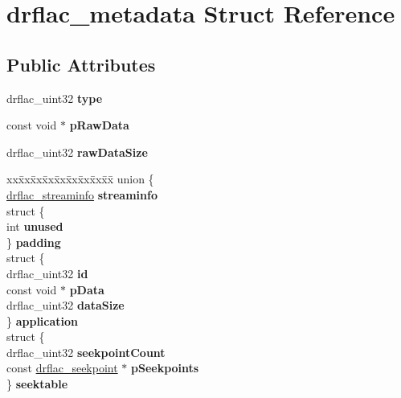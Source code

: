\hypertarget{structdrflac__metadata}{}\section{drflac\+\_\+metadata Struct Reference}
\label{structdrflac__metadata}
\subsection*{Public Attributes}
\begin{DoxyCompactItemize}
\item 
\mbox{\label{structdrflac__metadata_aa0eb90e626e17637ea5f8accae56a160}} 
drflac\+\_\+uint32 {\bfseries type}
\item 
\mbox{\label{structdrflac__metadata_a418724938d0f9a4a904ebaf539b9a952}} 
const void $\ast$ {\bfseries p\+Raw\+Data}
\item 
\mbox{\label{structdrflac__metadata_a19b1921b30f4330c3b4cabb355e9df81}} 
drflac\+\_\+uint32 {\bfseries raw\+Data\+Size}
\item 
\mbox{\label{structdrflac__metadata_aa6e10f0a5b79f3a01d19a22730076cfb}} 
\begin{tabbing}
xx\=xx\=xx\=xx\=xx\=xx\=xx\=xx\=xx\=\kill
union \{\\
\>\mbox{\hyperlink{structdrflac__streaminfo}{drflac\_streaminfo}} {\bfseries streaminfo}\\
\>struct \{\\
\>\>int {\bfseries unused}\\
\>\} {\bfseries padding}\\
\>struct \{\\
\>\>drflac\_uint32 {\bfseries id}\\
\>\>const void $\ast$ {\bfseries pData}\\
\>\>drflac\_uint32 {\bfseries dataSize}\\
\>\} {\bfseries application}\\
\>struct \{\\
\>\>drflac\_uint32 {\bfseries seekpointCount}\\
\>\>const \mbox{\hyperlink{structdrflac__seekpoint}{drflac\_seekpoint}} $\ast$ {\bfseries pSeekpoints}\\
\>\} {\bfseries seektable}\\

\end{tabbing}
\end{DoxyCompactItemize}
